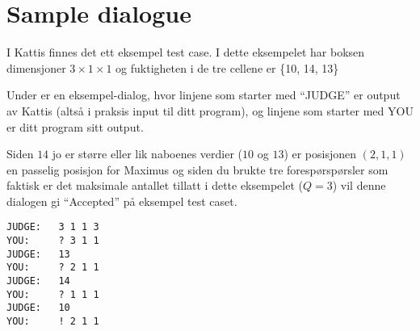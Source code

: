 \section*{Sample dialogue}
I Kattis finnes det ett eksempel test case.
I dette eksempelet har boksen dimensjoner $3\times 1\times 1$ og fuktigheten i de tre cellene er \{10, 14, 13\}

Under er en eksempel-dialog, hvor linjene som starter med ``JUDGE'' er output av Kattis (altså i praksis input til ditt program), og linjene som starter med YOU er ditt program sitt output.

Siden $14$ jo er større eller lik naboenes verdier ($10$ og $13$) er posisjonen $(2,1,1)$ en passelig posisjon for Maximus og siden du brukte tre forespørspørsler som faktisk er det maksimale antallet tillatt i dette eksempelet ($Q = 3$) vil denne dialogen gi ``Accepted'' på eksempel test caset.

\begin{verbatim}
JUDGE:   3 1 1 3
YOU:     ? 3 1 1
JUDGE:   13
YOU:     ? 2 1 1
JUDGE:   14
YOU:     ? 1 1 1
JUDGE:   10
YOU:     ! 2 1 1
\end{verbatim}
